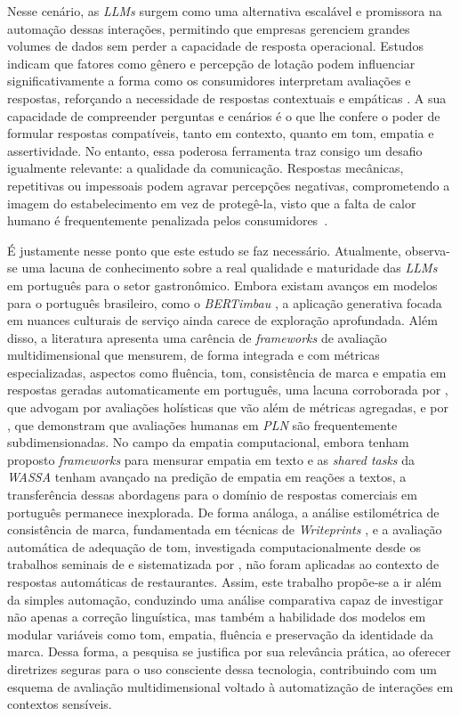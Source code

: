 \documentclass[12pt, a4paper]{article}
\numberwithin{equation}{section}
\begin{document}
Nesse cenário, as \textit{LLMs} surgem como uma alternativa escalável e promissora na automação dessas interações, permitindo que empresas gerenciem grandes volumes de dados sem perder a capacidade de resposta operacional. Estudos indicam que fatores como gênero e percepção de lotação podem influenciar significativamente a forma como os consumidores interpretam avaliações e respostas, reforçando a necessidade de respostas contextuais e empáticas \cite{ali2021Effect}. A sua capacidade de compreender perguntas e cenários é o que lhe confere o poder de formular respostas compatíveis, tanto em contexto, quanto em tom, empatia e assertividade. No entanto, essa poderosa ferramenta traz consigo um desafio igualmente relevante: a qualidade da comunicação. Respostas mecânicas, repetitivas ou impessoais podem agravar percepções negativas, comprometendo a imagem do estabelecimento em vez de protegê-la, visto que a falta de calor humano é frequentemente penalizada pelos consumidores~\cite{sands2020artificial}.

É justamente nesse ponto que este estudo se faz necessário. Atualmente, observa-se uma lacuna de conhecimento sobre a real qualidade e maturidade das \textit{LLMs} em português para o setor gastronômico. Embora existam avanços em modelos para o português brasileiro, como o \textit{BERTimbau} \cite{souza2020bertimbau}, a aplicação generativa focada em nuances culturais de serviço ainda carece de exploração aprofundada. Além disso, a literatura apresenta uma carência de \textit{frameworks} de avaliação multidimensional que mensurem, de forma integrada e com métricas especializadas, aspectos como fluência, tom, consistência de marca e empatia em respostas geradas automaticamente em português, uma lacuna corroborada por , que advogam por avaliações holísticas que vão além de métricas agregadas, e por , que demonstram que avaliações humanas em \textit{PLN} são frequentemente subdimensionadas. No campo da empatia computacional, embora  tenham proposto \textit{frameworks} para mensurar empatia em texto e as \textit{shared tasks} da \textit{WASSA} \cite{barriere2022,barriere2023,giorgi2024} tenham avançado na predição de empatia em reações a textos, a transferência dessas abordagens para o domínio de respostas comerciais em português permanece inexplorada. De forma análoga, a análise estilométrica de consistência de marca, fundamentada em técnicas de \textit{Writeprints} \cite{abbasi2008}, e a avaliação automática de adequação de tom, investigada computacionalmente desde os trabalhos seminais de  e sistematizada por , não foram aplicadas ao contexto de respostas automáticas de restaurantes. Assim, este trabalho propõe-se a ir além da simples automação, conduzindo uma análise comparativa capaz de investigar não apenas a correção linguística, mas também a habilidade dos modelos em modular variáveis como tom, empatia, fluência e preservação da identidade da marca. Dessa forma, a pesquisa se justifica por sua relevância prática, ao oferecer diretrizes seguras para o uso consciente dessa tecnologia, contribuindo com um esquema de avaliação multidimensional voltado à automatização de interações em contextos sensíveis.
\end{document}
